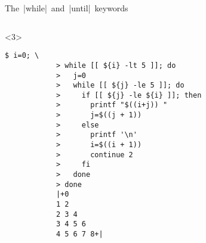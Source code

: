 \begin{frame}[fragile]{The \,\bash|while|\, and \,\bash|until|\, keywords}
\begin{onlyenv}
\begin{lstlisting}[style=MyBash]
        \end{lstlisting}
    \end{onlyenv}
    \begin{onlyenv}<3>
        \begin{lstlisting}[style=MyBash, emph={[2]{i,j}}]
            $ i=0; \
            > while [[ ${i} -lt 5 ]]; do
            >   j=0
            >   while [[ ${j} -le 5 ]]; do
            >     if [[ ${j} -le ${i} ]]; then
            >       printf "$((i+j)) "
            >       j=$((j + 1))
            >     else
            >       printf '\n'
            >       i=$((i + 1))
            >       continue 2
            >     fi
            >   done
            > done
            |+0
            1 2
            2 3 4
            3 4 5 6
            4 5 6 7 8+|
        \end{lstlisting}
    \end{onlyenv}
\end{frame}
